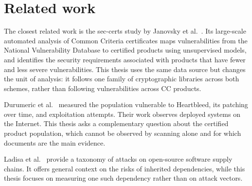 \section{Related work}
\label{sec:related}

The closest related work is the sec-certs study by Janovsky et
al.~\cite{janovsky2024seccerts}. Its large-scale automated analysis of Common
Criteria certificates maps vulnerabilities from the National Vulnerability
Database to certified products using unsupervised models, and identifies the
security requirements associated with products that have fewer and less severe
vulnerabilities. This thesis uses the same data source but changes the unit of
analysis: it follows one family of cryptographic libraries across both schemes,
rather than following vulnerabilities across CC products.

Durumeric et al.~\cite{durumeric2014heartbleed} measured the population
vulnerable to Heartbleed, its patching over time, and exploitation attempts.
Their work observes deployed systems on the Internet. This thesis asks a
complementary question about the certified product population, which cannot be
observed by scanning alone and for which documents are the main evidence.

Ladisa et al.~\cite{ladisa2023sok} provide a taxonomy of attacks on open-source
software supply chains. It offers general context on the risks of inherited
dependencies, while this thesis focuses on measuring one such dependency rather
than on attack vectors.


